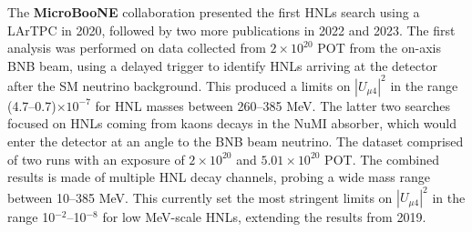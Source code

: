 \begin{coloritemize}
\item The \textbf{MicroBooNE} collaboration presented the first HNLs search using a LArTPC in 2020, followed by two more publications in 2022 and 2023.
The first analysis was performed on data collected from $2 \times 10^{20}$ POT from the on-axis BNB beam, using a delayed trigger to identify HNLs arriving at the detector after the SM neutrino background.
This produced a limits on $|U_{\mu4}|^{2}$ in the range (4.7--0.7)$\times 10^{-7}$ for HNL masses between 260--385 MeV.
The latter two searches focused on HNLs coming from kaons decays in the NuMI absorber, which would enter the detector at an angle to the BNB beam neutrino.
The dataset comprised of two runs with an exposure of $2 \times 10^{20}$ and $5.01 \times 10^{20}$ POT.
The combined results is made of multiple HNL decay channels, probing a wide mass range between 10--385 MeV.
This currently set the most stringent limits on $|U_{\mu4}|^{2}$ in the range 10$^{-2}$--10$^{-8}$ for low MeV-scale HNLs, extending the results from 2019.
\cite{uboone1, uboone2, uboone3}

\end{coloritemize}

